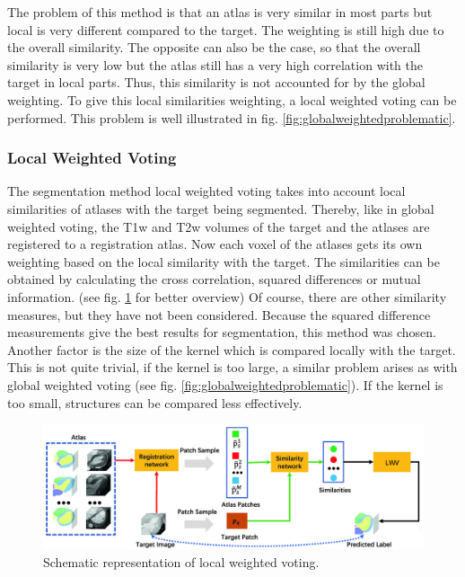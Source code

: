 The problem of this method is that an atlas is very similar in most parts but local is very different compared to the target. The weighting is still high due to the overall similarity. The opposite can also be the case, so that the overall similarity is very low but the atlas still has a very high correlation with the target in local parts. Thus, this similarity is not accounted for by the global weighting. To give this local similarities weighting, a local weighted voting can be performed. This problem is well illustrated in fig. \ref{fig:globalweightedproblematic}.

\subsubsection*{Local Weighted Voting}
The segmentation method local weighted voting takes into account local similarities of atlases with the target being segmented. Thereby, like in global weighted voting, the T1w and T2w volumes of the target and the atlases are registered to a registration atlas. Now each voxel of the atlases gets its own weighting based on the local similarity with the target. The similarities can be obtained by calculating the cross correlation, squared differences or mutual information. (see fig. \ref{fig:localWeightedVoting} for better overview) Of course, there are other similarity measures, but they have not been considered. Because the squared difference measurements give the best results for segmentation, this method was chosen\cite{b2}. Another factor is the size of the kernel which is compared locally with the target. This is not quite trivial, if the kernel is too large, a similar problem arises as with global weighted voting (see fig. \ref{fig:globalweightedproblematic}).  If the kernel is too small, structures can be compared less effectively.

\begin{figure}[h!]
	\centering
	\includegraphics[width=0.8\linewidth]{img/localWeightedVoting}
	\caption{Schematic representation of local weighted voting.}
	\label{fig:localWeightedVoting}
\end{figure}

